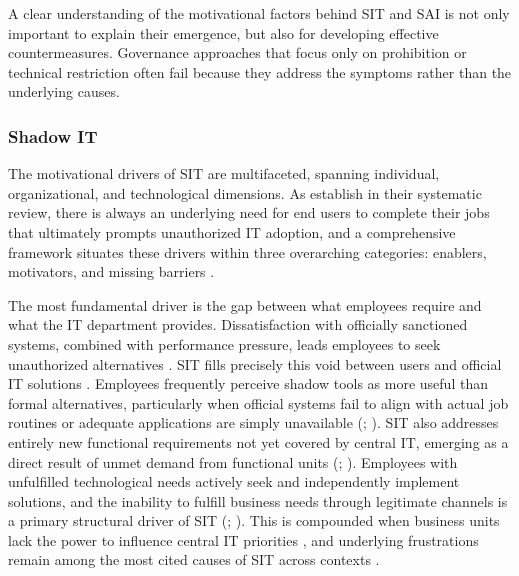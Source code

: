 \documentclass[12pt,oneside]{article}
\begin{document}
A clear understanding of the motivational factors behind \ac{SIT} and \ac{SAI} is not only important to explain their emergence, but also for developing effective countermeasures. Governance approaches that focus only on prohibition or technical restriction often fail because they address the symptoms rather than the underlying causes. 

\subsubsection{Shadow IT}

The motivational drivers of \ac{SIT} are multifaceted, spanning individual, organizational, and technological dimensions. As \citet[148]{rakovic2020shadow} establish in their systematic review, there is always an underlying need for end users to complete their jobs that ultimately prompts unauthorized \ac{IT} adoption, and a comprehensive framework situates these drivers within three overarching categories: enablers, motivators, and missing barriers \citep[22]{klotz2019causing}.

The most fundamental driver is the gap between what employees require and what the \ac{IT} department provides. Dissatisfaction with officially sanctioned systems, combined with performance pressure, leads employees to seek unauthorized alternatives \citep[233, 235]{pinto2023encourage}. \ac{SIT} fills precisely this void between users and official \ac{IT} solutions \citep[1023]{silic2017perspective}. Employees frequently perceive shadow tools as more useful than formal alternatives, particularly when official systems fail to align with actual job routines or adequate applications are simply unavailable (\citealp[3]{mallmann2016behavioral}; \citealp[1]{nwankpa2024shadow}). \ac{SIT} also addresses entirely new functional requirements not yet covered by central \ac{IT}, emerging as a direct result of unmet demand from functional units (\citealp[2]{chua2014central}; \citealp[11]{chua2014central}). Employees with unfulfilled technological needs actively seek and independently implement solutions, and the inability to fulfill business needs through legitimate channels is a primary structural driver of \ac{SIT} (\citealp[5]{klotz2019transformed}; \citealp[6]{gyoery2012exploring}). This is compounded when business units lack the power to influence central \ac{IT} priorities \citep[3]{furstenau2016shadow}, and underlying frustrations remain among the most cited causes of \ac{SIT} across contexts \citep[653]{walterbusch2017missing}.
\end{document}
